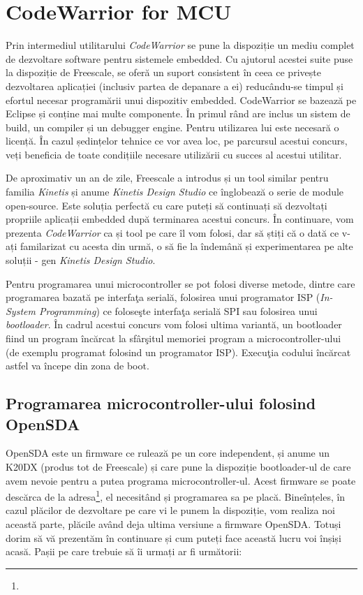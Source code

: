 \chapter{CodeWarrior for MCU}

Prin intermediul utilitarului \textit{CodeWarrior} se pune la dispoziție un mediu complet de dezvoltare software pentru sistemele embedded. Cu ajutorul acestei suite puse la dispoziție de Freescale, se oferă un suport consistent în ceea ce privește dezvoltarea aplicației (inclusiv partea de depanare a ei) reducându-se timpul și efortul necesar programării unui dispozitiv embedded. CodeWarrior se bazează pe Eclipse și conține mai multe componente. În primul rând are inclus un sistem de build, un compiler și un debugger engine. Pentru utilizarea lui este necesară o licență. În cazul ședințelor tehnice ce vor avea loc, pe parcursul acestui concurs, veți beneficia de toate condițiile necesare utilizării cu succes al acestui utilitar.

De aproximativ un an de zile, Freescale a introdus și un tool similar pentru familia \textit{Kinetis} și anume \textit{Kinetis Design Studio} ce înglobează o serie de module open-source. Este soluția perfectă cu care puteți să continuați să dezvoltați propriile aplicații embedded după terminarea acestui concurs. În continuare, vom prezenta \textit{CodeWarrior} ca și tool pe care îl vom folosi, dar să știți că o dată ce v-ați familarizat cu acesta din urmă, o să fie la îndemână și experimentarea pe alte soluții - gen \textit{Kinetis Design Studio}.

Pentru programarea unui microcontroller se pot folosi diverse metode, dintre care programarea bazată pe interfaţa serială, folosirea unui programator ISP (\textit{In-System Programming}) ce foloseşte interfaţa serială SPI sau folosirea unui \textit{bootloader}. În cadrul acestui concurs vom folosi ultima variantă, un bootloader fiind un program încărcat la sfârşitul memoriei program a microcontroller-ului (de exemplu programat folosind un programator ISP). Execuţia codului încărcat astfel va începe din zona de boot.

\section{Programarea microcontroller-ului folosind OpenSDA}

OpenSDA este un firmware ce rulează pe un core independent, și anume un K20DX (produs tot de Freescale) și care pune la dispoziție bootloader-ul de care avem nevoie pentru a putea programa microcontroller-ul. Acest firmware se poate descărca de la adresa\footnote{}, el necesitând și programarea sa pe placă. Bineînțeles, în cazul plăcilor de dezvoltare pe care vi le punem la dispoziție, vom realiza noi această parte, plăcile având deja ultima versiune a firmware OpenSDA. Totuși dorim să vă prezentăm în continuare și cum puteți face această lucru voi înșiși acasă. Pașii pe care trebuie să îi urmați ar fi următorii:

